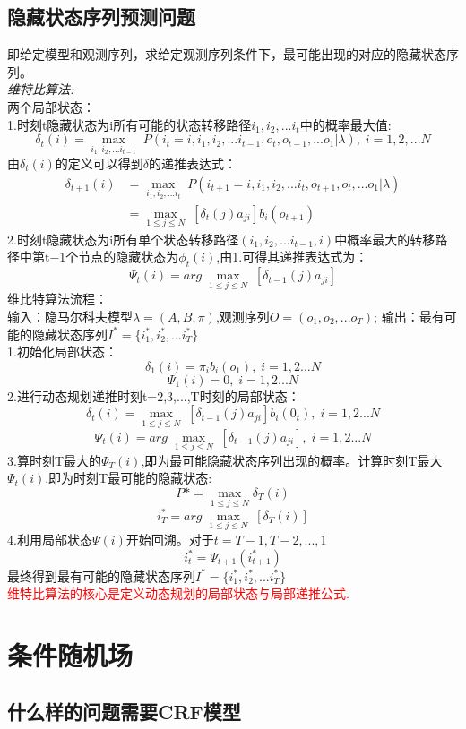 \documentclass[UTF8]{article}%
\begin{document}
	\subsection{隐藏状态序列预测问题}
	即给定模型和观测序列，求给定观测序列条件下，最可能出现的对应的隐藏状态序列。\\
	\emph{\large 维特比算法:}\\
	两个局部状态：\\
	1.时刻t隐藏状态为i所有可能的状态转移路径$i_1,i_2,...i_t$中的概率最大值:
	$$\delta_t(i) = \max_{i_1,i_2,...i_{t-1}}\;P(i_t=i, i_1,i_2,...i_{t-1},o_t,o_{t-1},...o_1|\lambda),\; i =1,2,...N$$
	由$\delta_t(i)$的定义可以得到$\delta$的递推表达式：
	\begin{align} 
	\delta_{t+1}(i)
	& =  \max_{i_1,i_2,...i_{t}} \; P(i_{t+1}=i,i_1,i_2,...i_{t},o_{t+1},o_{t},...o_1|\lambda)\\ 
	& = \max_{1 \leq j \leq N}\;[\delta_t(j)a_{ji}]b_i(o_{t+1})
	\end{align}
	2.时刻t隐藏状态为i所有单个状态转移路径$(i_1,i_2,...i_{t-1},i)$中概率最大的转移路径中第t−1个节点的隐藏状态为$\phi_t(i)$,由1.可得其递推表达式为：
	$$\Psi_t(i) = arg \; \max_{1 \leq j \leq N}\;[\delta_{t-1}(j)a_{ji}]$$
	维比特算法流程：\\
	输入：隐马尔科夫模型$\lambda = (A,B,\pi)$,观测序列$O=(o_1,o_2,...o_T)$;
	输出：最有可能的隐藏状态序列$I^*= \{i_1^*,i_2^*,...i_T^*\}$\\
	1.初始化局部状态：
	$$\delta_1(i) = \pi_ib_i(o_1),\;i=1,2...N$$
	$$\Psi_1(i)=0,\;i=1,2...N$$
	2.进行动态规划递推时刻t=2,3,...,T时刻的局部状态：
	$$\delta_{t}(i) = \max_{1 \leq j \leq N}\;[\delta_{t-1}(j)a_{ji}]b_i(0_{t}),\;i=1,2...N$$
	$$\Psi_t(i) = arg \; \max_{1 \leq j \leq N}\;[\delta_{t-1}(j)a_{ji}],\;i=1,2...N$$
	3.算时刻T最大的$\Psi_T(i)$,即为最可能隐藏状态序列出现的概率。计算时刻T最大$\Psi_t(i)$,即为时刻T最可能的隐藏状态:
	$$P* = \max_{1 \leq j \leq N}\delta_{T}(i)$$
	$$i_T^* = arg \; \max_{1 \leq j \leq N}\;[\delta_{T}(i)]$$
	4.利用局部状态$\Psi(i) $开始回溯。对于$t=T-1,T-2,...,1$
	$$i_t^* = \Psi_{t+1}(i_{t+1}^*)$$
	最终得到最有可能的隐藏状态序列$I^*= \{i_1^*,i_2^*,...i_T^*\}$\\
	\textcolor{red}{维特比算法的核心是定义动态规划的局部状态与局部递推公式.}
	
	\newpage
	\section{条件随机场}
	\subsection{什么样的问题需要CRF模型}
\end{document}
